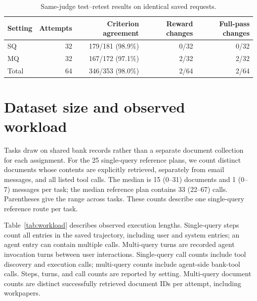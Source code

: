 \documentclass[11pt,letterpaper]{article}
\begin{document}
\begin{table}[H]\centering\small
\begin{tabular}{@{}lrrrr@{}}\toprule
Setting & Attempts & Criterion agreement & Reward changes & Full-pass changes\\\midrule
SQ & 32 & 179/181 (98.9\%) & 0/32 & 0/32\\
MQ & 32 & 167/172 (97.1\%) & 2/32 & 2/32\\
Total & 64 & 346/353 (98.0\%) & 2/64 & 2/64\\\bottomrule
\end{tabular}
\caption{Same-judge test--retest results on identical saved requests.}\label{tab:judge-repeat}
\end{table}

\section{Dataset size and observed workload}\label{sec:resources}
Tasks draw on shared bank records rather than a separate document collection for each assignment. For the 25 single-query reference plans, we count distinct documents whose contents are explicitly retrieved, separately from email messages, and all listed tool calls. The median is 15 (0--31) documents and 1 (0--7) messages per task; the median reference plan contains 33 (22--67) calls. Parentheses give the range across tasks. These counts describe one single-query reference route per task.

Table~\ref{tab:workload} describes observed execution lengths. Single-query steps count all entries in the saved trajectory, including user and system entries; an agent entry can contain multiple calls. Multi-query turns are recorded agent invocation turns between user interactions. Single-query call counts include tool discovery and execution calls; multi-query counts include agent-side bank-tool calls. Steps, turns, and call counts are reported by setting. Multi-query document counts are distinct successfully retrieved document IDs per attempt, including workpapers.
\end{document}
